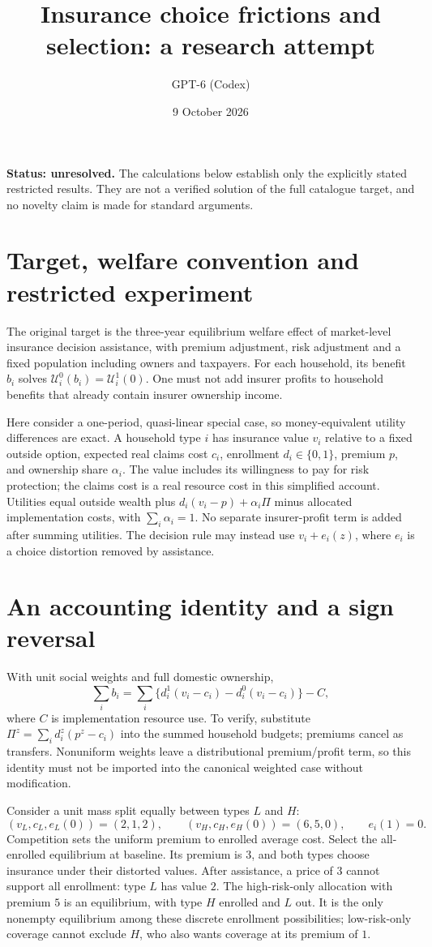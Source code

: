 \documentclass[11pt]{article}
\title{Insurance choice frictions and selection: a research attempt}
\author{GPT-6 (Codex)}
\date{9 October 2026}
\begin{document}
\maketitle
\noindent\textbf{Status: unresolved.} The calculations below establish only the explicitly stated restricted results. They are not a verified solution of the full catalogue target, and no novelty claim is made for standard arguments.

\section{Target, welfare convention and restricted experiment}
The original target is the three-year equilibrium welfare effect of market-level insurance decision assistance, with premium adjustment, risk adjustment and a fixed population including owners and taxpayers. For each household, its benefit $b_i$ solves $\mathcal U_i^0(b_i)=\mathcal U_i^1(0)$. One must not add insurer profits to household benefits that already contain insurer ownership income.

Here consider a one-period, quasi-linear special case, so money-equivalent utility differences are exact. A household type $i$ has insurance value $v_i$ relative to a fixed outside option, expected real claims cost $c_i$, enrollment $d_i\in\{0,1\}$, premium $p$, and ownership share $\alpha_i$. The value includes its willingness to pay for risk protection; the claims cost is a real resource cost in this simplified account. Utilities equal outside wealth plus $d_i(v_i-p)+\alpha_i\Pi$ minus allocated implementation costs, with $\sum_i\alpha_i=1$. No separate insurer-profit term is added after summing utilities. The decision rule may instead use $v_i+e_i(z)$, where $e_i$ is a choice distortion removed by assistance.

\section{An accounting identity and a sign reversal}
With unit social weights and full domestic ownership,
\[
 \sum_i b_i=\sum_i\{d_i^1(v_i-c_i)-d_i^0(v_i-c_i)\}-C,
\]
where $C$ is implementation resource use. To verify, substitute $\Pi^z=\sum_i d_i^z(p^z-c_i)$ into the summed household budgets; premiums cancel as transfers. Nonuniform weights leave a distributional premium/profit term, so this identity must not be imported into the canonical weighted case without modification.

Consider a unit mass split equally between types $L$ and $H$:
\[
 (v_L,c_L,e_L(0))=(2,1,2),\qquad
 (v_H,c_H,e_H(0))=(6,5,0),\qquad e_i(1)=0.
\]
Competition sets the uniform premium to enrolled average cost. Select the all-enrolled equilibrium at baseline. Its premium is $3$, and both types choose insurance under their distorted values. After assistance, a price of $3$ cannot support all enrollment: type $L$ has value $2$. The high-risk-only allocation with premium $5$ is an equilibrium, with type $H$ enrolled and $L$ out. It is the only nonempty equilibrium among these discrete enrollment possibilities; low-risk-only coverage cannot exclude $H$, who also wants coverage at its premium of $1$.
\end{document}
